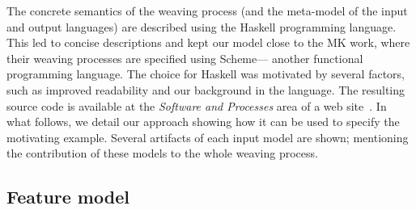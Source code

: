 {\color{blue}The {\color{red}concrete semantics} of the weaving process (and the
meta-model of the input and output languages) are described using the Haskell
programming language. This led to concise descriptions and kept our model close
to the MK work, where their weaving processes are specified using Scheme---
another functional programming language. The choice for Haskell was motivated by
several factors, such as improved readability and our background in the language.
The resulting source code is available at the \emph{Software and Processes} area
of a web site~\cite{SPG:site}.} In what follows, we detail our approach showing
how it can be used to specify the motivating example. Several artifacts of each
input model are shown; mentioning the contribution of these models to the whole
weaving process.




\subsection{Feature model}

